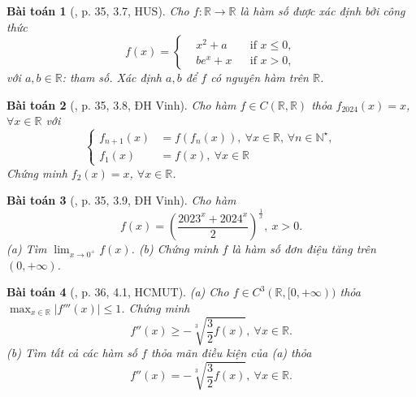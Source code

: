 \documentclass{article}
\newtheorem{baitoan}{Bài toán}
\begin{document}
\begin{baitoan}[\cite{VMS_VMC2024}, p. 35, 3.7, HUS]
	Cho $f:\mathbb{R}\to\mathbb{R}$ là hàm số được xác định bởi công thức
	\begin{equation*}
		f(x) = \left\{\begin{split}
			&x^2 + a&&\mbox{if } x\le0,\\
			&be^x + x&&\mbox{if } x > 0,
		\end{split}\right.
	\end{equation*}
	với $a,b\in\mathbb{R}$: tham số. Xác định $a,b$ để $f$ có nguyên hàm trên $\mathbb{R}$.
\end{baitoan}

\begin{baitoan}[\cite{VMS_VMC2024}, p. 35, 3.8, ĐH Vinh]
	Cho hàm $f\in C(\mathbb{R},\mathbb{R})$ thỏa $f_{2024}(x) = x$, $\forall x\in\mathbb{R}$ với
	\begin{equation*}
		\left\{\begin{split}
			f_{n+1}(x) &= f(f_n(x)),\ \forall x\in\mathbb{R},\,\forall n\in\mathbb{N}^\star,\\
			f_1(x) &= f(x),\ \forall x\in\mathbb{R}
		\end{split}\right.
	\end{equation*}
	Chứng minh $f_2(x) = x$, $\forall x\in\mathbb{R}$.
\end{baitoan}

\begin{baitoan}[\cite{VMS_VMC2024}, p. 35, 3.9, ĐH Vinh]
	Cho hàm
	\begin{equation*}
		f(x) = \left(\frac{2023^x + 2024^x}{2}\right)^{\frac{1}{x}},\ x > 0.
	\end{equation*}
	(a) Tìm $\lim_{x\to0^+} f(x)$. (b) Chứng minh $f$ là hàm số đơn điệu tăng trên $(0,+\infty)$.
\end{baitoan}

\begin{baitoan}[\cite{VMS_VMC2024}, p. 36, 4.1, HCMUT]
	(a) Cho $f\in C^3(\mathbb{R},[0,+\infty))$ thỏa $\max_{x\in\mathbb{R}} |f'''(x)|\le1$. Chứng minh
	\begin{equation*}
		f''(x)\ge-\sqrt[3]{\frac{3}{2}f(x)},\ \forall x\in\mathbb{R}.
	\end{equation*}
	(b) Tìm tất cả các hàm số $f$ thỏa mãn điều kiện của (a) thỏa
	\begin{equation*}
		f''(x) = -\sqrt[3]{\frac{3}{2}f(x)},\ \forall x\in\mathbb{R}.
	\end{equation*}
\end{baitoan}
\end{document}
